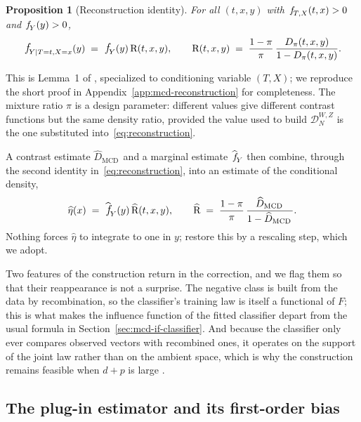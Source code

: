 \documentclass[11pt]{article}
\theoremstyle{plain}
\newtheorem{mypropo}{Proposition}
\theoremstyle{definition}
\theoremstyle{remark}
\newcommand{\mcd}{\text{MCD}\,}
\newcommand{\pf}[1]{\ensuremath{\,\mathlarger{\textit{f}}_{#1}}}
\newcommand{\pfhat}[1]{\ensuremath{\,\mathlarger{\widehat{\textit{f}}}_{#1}}}
\newcommand{\ratio}{\ensuremath{\pi}}
\newcommand{\contrast}{D_{\ratio}}
\newcommand{\contrasthat}{\widehat{D}_{\mcd}}
\newcommand{\DensityRatio}{\text{R}}
\newcommand{\mDwz}[1]{\ensuremath{\mathcal{D}}_{#1}^{W,Z}}
\begin{document}
\begin{mypropo}[Reconstruction identity]
\label{prop:reconstruction}
For all $(t,x,y)$ with $\pf{T,X}(t,x) > 0$ and $\pf{Y}(y) > 0$,
\begin{equation}
\pf{Y \mid T=t,X=x}(y) \;=\; \pf{Y}(y)\,\DensityRatio(t,x,y),
\qquad
\DensityRatio(t,x,y) \;=\; \frac{1-\ratio}{\ratio}\,
\frac{\contrast(t,x,y)}{1-\contrast(t,x,y)} .
\label{eq:reconstruction}
\end{equation}
\end{mypropo}

This is Lemma~1 of \citet{meziani2025mcd}, specialized to conditioning variable $(T,X)$; we
reproduce the short proof in Appendix~\ref{app:mcd-reconstruction} for completeness. The
mixture ratio $\ratio$ is a design parameter: different values give different contrast
functions but the same density ratio, provided the value used to build $\mDwz{N}$ is the one
substituted into~\eqref{eq:reconstruction}.

A contrast estimate $\contrasthat$ and a marginal estimate $\pfhat{Y}$ then combine, through
the second identity in~\eqref{eq:reconstruction}, into an estimate of the conditional density,
\[
\widehat\eta(x) \;=\; \pfhat{Y}(y)\,\widehat{\DensityRatio}(t,x,y),
\qquad
\widehat{\DensityRatio} \;=\; \frac{1-\ratio}{\ratio}\,
\frac{\contrasthat}{1-\contrasthat} .
\]
Nothing forces $\widehat\eta$ to integrate to one in $y$; \citet{meziani2025mcd} restore this
by a rescaling step, which we adopt.

Two features of the construction return in the correction, and we flag them so that their
reappearance is not a surprise. The negative class is built from the data by recombination, so
the classifier's training law is itself a functional of $F$; this is what makes the influence
function of the fitted classifier depart from the usual formula in
Section~\ref{sec:mcd-if-classifier}. And because the classifier only ever compares observed
vectors with recombined ones, it operates on the support of the joint law rather than on the
ambient space, which is why the construction remains feasible when $d+p$ is large
\citep{meziani2025mcd}.

\subsection{The plug-in estimator and its first-order bias}
\label{sec:setting-plugin}
\end{document}
